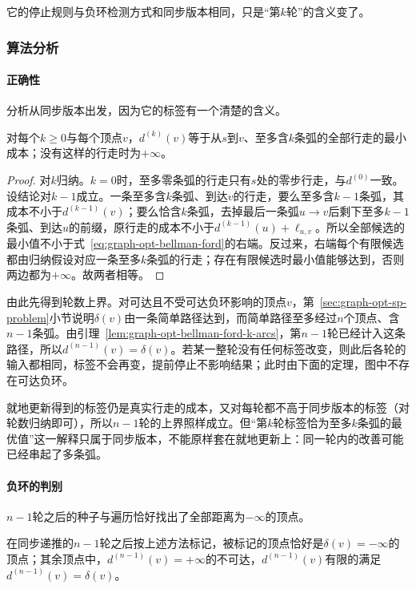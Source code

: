 它的停止规则与负环检测方式和同步版本相同，只是“第$k$轮”的含义变了。

\subsubsection{算法分析}

\paragraph{正确性}
分析从同步版本出发，因为它的标签有一个清楚的含义。

\begin{lemma}[同步标签的含义]
\label{lem:graph-opt-bellman-ford-k-arcs}
对每个$k\geq0$与每个顶点$v$，$d^{(k)}(v)$等于从$s$到$v$、至多含$k$条弧的全部行走的最小成本；没有这样的行走时为$+\infty$。
\end{lemma}

\begin{proof}
对$k$归纳。$k=0$时，至多零条弧的行走只有$s$处的零步行走，与$d^{(0)}$一致。设结论对$k-1$成立。一条至多含$k$条弧、到达$v$的行走，要么至多含$k-1$条弧，其成本不小于$d^{(k-1)}(v)$；要么恰含$k$条弧，去掉最后一条弧$u\to v$后剩下至多$k-1$条弧、到达$u$的前缀，原行走的成本不小于$d^{(k-1)}(u)+\ell_{u,v}$。所以全部候选的最小值不小于式~\eqref{eq:graph-opt-bellman-ford}的右端。反过来，右端每个有限候选都由归纳假设对应一条至多$k$条弧的行走；存在有限候选时最小值能够达到，否则两边都为$+\infty$。故两者相等。
\end{proof}

由此先得到轮数上界。对可达且不受可达负环影响的顶点$v$，第~\ref{sec:graph-opt-sp-problem}小节说明$\delta(v)$由一条简单路径达到，而简单路径至多经过$n$个顶点、含$n-1$条弧。由引理~\ref{lem:graph-opt-bellman-ford-k-arcs}，第$n-1$轮已经计入这条路径，所以$d^{(n-1)}(v)=\delta(v)$。若某一整轮没有任何标签改变，则此后各轮的输入都相同，标签不会再变，提前停止不影响结果；此时由下面的定理，图中不存在可达负环。

就地更新得到的标签仍是真实行走的成本，又对每轮都不高于同步版本的标签（对轮数归纳即可），所以$n-1$轮的上界照样成立。但“第$k$轮标签恰为至多$k$条弧的最优值”这一解释只属于同步版本，不能原样套在就地更新上：同一轮内的改善可能已经串起了多条弧。

\paragraph{负环的判别}
$n-1$轮之后的种子与遍历恰好找出了全部距离为$-\infty$的顶点。

\begin{theorem}
\label{thm:graph-opt-bellman-ford-negative-cycles}
在同步递推的$n-1$轮之后按上述方法标记，被标记的顶点恰好是$\delta(v)=-\infty$的顶点；其余顶点中，$d^{(n-1)}(v)=+\infty$的不可达，$d^{(n-1)}(v)$有限的满足$d^{(n-1)}(v)=\delta(v)$。
\end{theorem}

